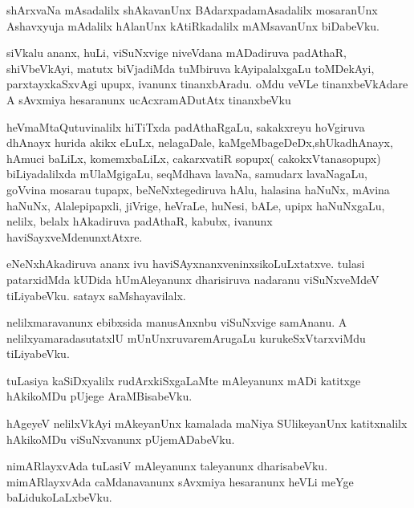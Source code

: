 \documentclass{article}
\begin{document}
\begin{mn}%
shArxvaNa mAsadalilx shAkavanUnx BAdarxpadamAsadalilx mosaranUnx Ashavxyuja mAdalilx 
hAlanUnx kAtiRkadalilx mAMsavanUnx biDabeVku.
\end{mn}

\begin{mn}%
siVkalu ananx, huLi, viSuNxvige niveVdana mADadiruva padAthaR, shiVbeVkAyi, matutx 
biVjadiMda tuMbiruva kAyipalalxgaLu toMDekAyi, parxtayxkaSxvAgi  upupx, ivanunx 
tinanxbAradu. oMdu veVLe tinanxbeVkAdare A sAvxmiya hesaranunx ucAcxramADutAtx tinanxbeVku
\end{mn}

\begin{mn}%
heVmaMtaQutuvinalilx hiTiTxda padAthaRgaLu, sakakxreyu hoVgiruva dhAnayx hurida akikx 
eLuLx, nelagaDale, kaMgeMbageDeDx,shUkadhAnayx, hAmuci baLiLx, komemxbaLiLx, cakarxvatiR 
sopupx( cakokxVtanasopupx) biLiyadalilxda mUlaMgigaLu, seqMdhava lavaNa, samudarx 
lavaNagaLu, goVvina mosarau tupapx, beNeNxtegediruva hAlu, halasina haNuNx, mAvina 
haNuNx, Alalepipapxli, jiVrige, heVraLe, huNesi, bALe, upipx haNuNxgaLu, nelilx, belalx 
hAkadiruva padAthaR, kabubx, ivanunx haviSayxveMdenunxtAtxre.
\end{mn}

\begin{mn}%
eNeNxhAkadiruva ananx ivu haviSAyxnanxveninxsikoLuLxtatxve. tulasi patarxidMda kUDida 
hUmAleyanunx dharisiruva nadaranu viSuNxveMdeV tiLiyabeVku. satayx saMshayavilalx.
\end{mn}

\begin{mn}%
nelilxmaravanunx ebibxsida manusAnxnbu viSuNxvige samAnanu. A nelilxyamaradasutatxlU 
mUnUnxruvaremArugaLu kurukeSxVtarxviMdu tiLiyabeVku.
\end{mn}

\begin{mn}%
tuLasiya kaSiDxyalilx rudArxkiSxgaLaMte mAleyanunx mADi katitxge hAkikoMDu pUjege 
AraMBisabeVku.
\end{mn}

\begin{mn}%
hAgeyeV nelilxVkAyi mAkeyanUnx kamalada maNiya SUlikeyanUnx katitxnalilx hAkikoMDu 
viSuNxvanunx pUjemADabeVku.
\end{mn}

\begin{mn}%
nimARlayxvAda tuLasiV mAleyanunx taleyanunx dharisabeVku. mimARlayxvAda caMdanavanunx 
sAvxmiya hesaranunx heVLi meYge baLidukoLaLxbeVku.
\end{mn}
\end{document}
